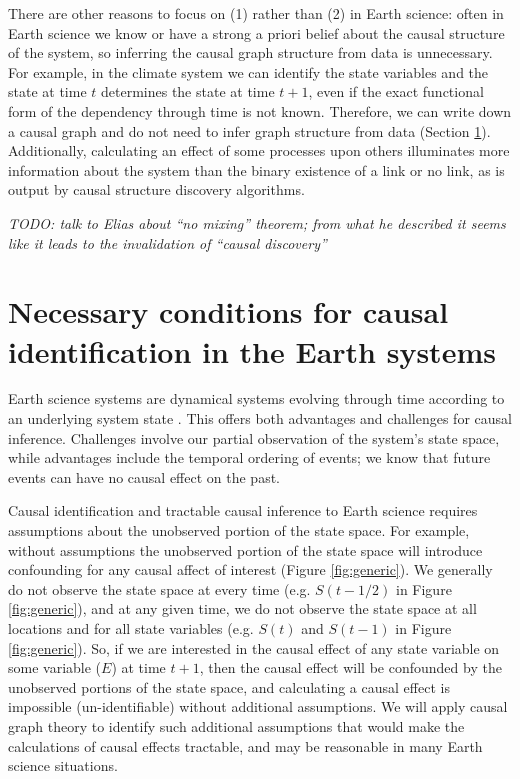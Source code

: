 \documentclass[12pt]{article}
\begin{document}
There are other reasons to focus on (1) rather than (2) in Earth
science: often in Earth science we know or have a strong a priori
belief about the causal structure of the system, so inferring the
causal graph structure from data is unnecessary. For example, in the
climate system we can identify the state variables and the state at
time \(t\) determines the state at time \(t+1\), even if the exact
functional form of the dependency through time is not
known. Therefore, we can write down a causal graph and do not need to
infer graph structure from data (Section
\ref{sec:necess-cond-caus}). Additionally, calculating an effect of
some processes upon others illuminates more information about the
system than the binary existence of a link or no link, as is output by
causal structure discovery algorithms.



\textit{
  TODO: talk to Elias about ``no mixing'' theorem; from what he
  described it seems like it leads to the invalidation of ``causal
  discovery''
}

\section{Necessary conditions for causal identification in the Earth
  systems}
\label{sec:necess-cond-caus}

Earth science systems are dynamical systems evolving through time
according to an underlying system state
\citep{lorenz-1963,majda-state}. This offers both advantages and
challenges for causal inference. Challenges involve our partial
observation of the system's state space, while advantages include the
temporal ordering of events; we know that future events can have no
causal effect on the past.

Causal identification and tractable causal inference to Earth science
requires assumptions about the unobserved portion of the state
space. For example, without assumptions the unobserved portion of the
state space will introduce confounding for any causal affect of
interest (Figure \ref{fig:generic}). We generally do not observe the
state space at every time (e.g. $S(t-1/2)$ in Figure
\ref{fig:generic}), and at any given time, we do not observe the state
space at all locations and for all state variables (e.g. $S(t)$ and
$S(t-1)$ in Figure \ref{fig:generic}). So, if we are interested in the
causal effect of any state variable on some variable ($E$) at time
$t+1$, then the causal effect will be confounded by the unobserved
portions of the state space, and calculating a causal effect is
impossible (un-identifiable) without additional assumptions. We will
apply causal graph theory to identify such additional assumptions that
would make the calculations of causal effects tractable, and may be
reasonable in many Earth science situations.
\end{document}
